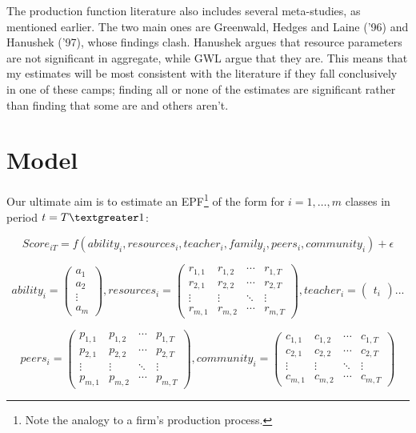 \documentclass[11pt]{article}
\begin{document}
The production function literature also includes several meta-studies, as mentioned earlier. The two main ones are Greenwald, Hedges and Laine ('96) and Hanushek ('97), whose findings clash. Hanushek argues that resource parameters are not significant in aggregate, while GWL argue that they are. This means that my estimates will be most consistent with the literature if they fall conclusively in one of these camps; finding all or none of the estimates are significant rather than finding that some are and others aren't.




\section{Model}
\label{s:next}

Our ultimate aim is to estimate an EPF\footnote{Note the analogy to a firm's production process.} of the form for $i=1,\ldots,m$ classes in period $t=T\textgreater1$:

$$Score_{iT} = f(ability_{i},resources_{i},teacher_{i},family_{i},peers_{i},community_{i}) + \epsilon$$

$$ability_{i} = 
 \begin{pmatrix}
  a_{1} \\
  a_{2} \\
  \vdots  \\
  a_{m}  
 \end{pmatrix} ,
 resources_{i} = 
 \begin{pmatrix}
  r_{1,1} & r_{1,2} & \cdots & r_{1,T} \\
  r_{2,1} & r_{2,2} & \cdots & r_{2,T} \\
  \vdots  & \vdots  & \ddots & \vdots  \\
  r_{m,1} & r_{m,2} & \cdots & r_{m,T} 
 \end{pmatrix},
  teacher_{i} = 
 \begin{pmatrix}
  t_{i}  
 \end{pmatrix}
 ...$$
 
 $$peers_{i} = 
 \begin{pmatrix}
  p_{1,1} & p_{1,2} & \cdots & p_{1,T} \\
  p_{2,1} & p_{2,2} & \cdots & p_{2,T} \\
  \vdots  & \vdots  & \ddots & \vdots  \\
  p_{m,1} & p_{m,2} & \cdots & p_{m,T} 
 \end{pmatrix},
  community_{i} = 
 \begin{pmatrix}
  c_{1,1} & c_{1,2} & \cdots & c_{1,T} \\
  c_{2,1} & c_{2,2} & \cdots & c_{2,T} \\
  \vdots  & \vdots  & \ddots & \vdots  \\
  c_{m,1} & c_{m,2} & \cdots & c_{m,T} 
 \end{pmatrix}$$
 
\end{document}
